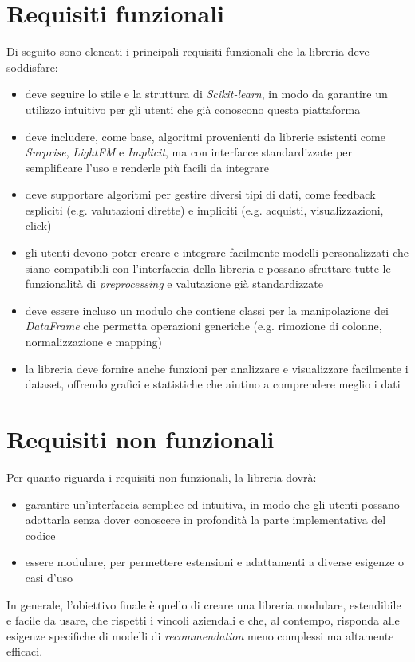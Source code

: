 \section{Requisiti funzionali}

Di seguito sono elencati i principali requisiti funzionali che la libreria deve soddisfare:

\begin{itemize}
    \item deve seguire lo stile e la struttura di \textit{Scikit-learn}, in modo da garantire un utilizzo intuitivo per gli utenti che già conoscono questa piattaforma
    \item deve includere, come base, algoritmi provenienti da librerie esistenti come \textit{Surprise}, \textit{LightFM} e \textit{Implicit}, ma con interfacce standardizzate per semplificare l'uso e renderle più facili da integrare
    \item deve supportare algoritmi per gestire diversi tipi di dati, come feedback espliciti (e.g. valutazioni dirette) e impliciti (e.g. acquisti, visualizzazioni, click)
    \item gli utenti devono poter creare e integrare facilmente modelli personalizzati che siano compatibili con l'interfaccia della libreria e possano sfruttare tutte le funzionalità di \textit{preprocessing} e valutazione già standardizzate
    \item deve essere incluso un modulo che contiene classi per la manipolazione dei \textit{DataFrame} che permetta operazioni generiche (e.g. rimozione di colonne, normalizzazione e mapping)
    \item la libreria deve fornire anche funzioni per analizzare e visualizzare facilmente i dataset, offrendo grafici e statistiche che aiutino a comprendere meglio i dati
\end{itemize}

\section{Requisiti non funzionali}

Per quanto riguarda i requisiti non funzionali, la libreria dovrà:

\begin{itemize}
    \item garantire un'interfaccia semplice ed intuitiva, in modo che gli utenti possano adottarla senza dover conoscere in profondità la parte implementativa del codice
    \item essere modulare, per permettere estensioni e adattamenti a diverse esigenze o casi d'uso
\end{itemize}

In generale, l'obiettivo finale è quello di creare una libreria modulare, estendibile e facile da usare, che rispetti i vincoli aziendali e che, al contempo, risponda alle esigenze specifiche di modelli di \textit{recommendation} meno complessi ma altamente efficaci.



